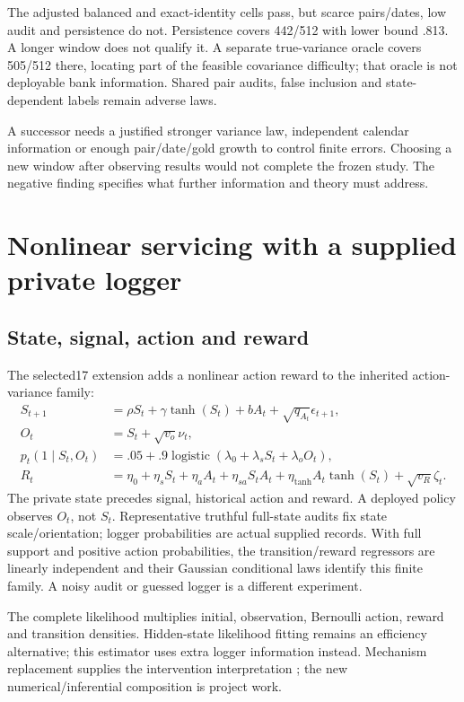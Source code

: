 The adjusted balanced and exact-identity cells pass, but scarce pairs/dates, low audit and persistence do not. Persistence covers 442/512 with lower bound .813. A longer window does not qualify it. A separate true-variance oracle covers 505/512 there, locating part of the feasible covariance difficulty; that oracle is not deployable bank information. Shared pair audits, false inclusion and state-dependent labels remain adverse laws.

A successor needs a justified stronger variance law, independent calendar information or enough pair/date/gold growth to control finite errors. Choosing a new window after observing results would not complete the frozen study. The negative finding specifies what further information and theory must address.

\section{Nonlinear servicing with a supplied private logger}
\subsection{State, signal, action and reward}
The selected17 extension adds a nonlinear action reward to the inherited action-variance family:
\begin{align*}
 S_{t+1}&=\rho S_t+\gamma\tanh(S_t)+bA_t+\sqrt{q_{A_t}}\epsilon_{t+1},\\
 O_t&=S_t+\sqrt{v_o}\nu_t,\\
 p_t(1\mid S_t,O_t)&=.05+.9\operatorname{logistic}(\lambda_0+\lambda_sS_t+\lambda_oO_t),\\
 R_t&=\eta_0+\eta_sS_t+\eta_aA_t+\eta_{sa}S_tA_t+
 \eta_{\tanh}A_t\tanh(S_t)+\sqrt{v_R}\zeta_t.
\end{align*}
The private state precedes signal, historical action and reward. A deployed policy observes $O_t$, not $S_t$. Representative truthful full-state audits fix state scale/orientation; logger probabilities are actual supplied records. With full support and positive action probabilities, the transition/reward regressors are linearly independent and their Gaussian conditional laws identify this finite family. A noisy audit or guessed logger is a different experiment.

The complete likelihood multiplies initial, observation, Bernoulli action, reward and transition densities. Hidden-state likelihood fitting remains an efficiency alternative; this estimator uses extra logger information instead. Mechanism replacement supplies the intervention interpretation \cite{pearl2009}; the new numerical/inferential composition is project work.

